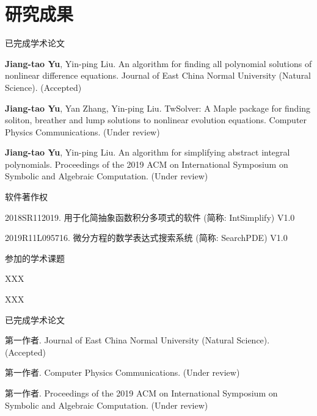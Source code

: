\chapter*{研究成果}

\ifdefined\RELESE %

\noindent 已完成学术论文
\begin{enumerate}[label={[\arabic*]},leftmargin=*]
\item {\bf Jiang-tao Yu}, Yin-ping Liu. An algorithm for finding all polynomial
solutions of nonlinear difference equations. Journal of East China Normal University (Natural Science). (Accepted)
\item {\bf Jiang-tao Yu}, Yan Zhang, Yin-ping Liu. TwSolver: A Maple package for finding soliton, breather and lump solutions to nonlinear evolution equations. Computer Physics Communications. (Under review)
\item {\bf Jiang-tao Yu}, Yin-ping Liu. An algorithm for simplifying abstract integral polynomials. Proceedings of the 2019 ACM on International Symposium on Symbolic and Algebraic Computation. (Under review)
\end{enumerate}

\noindent 软件著作权
\begin{enumerate}[label={[\arabic*]},leftmargin=*]
\item 2018SR112019. 用于化简抽象函数积分多项式的软件 (简称: IntSimplify) V1.0
\item 2019R11L095716. 微分方程的数学表达式搜索系统 (简称: SearchPDE) V1.0
\end{enumerate}

\noindent 参加的学术课题
\begin{enumerate}[label={[\arabic*]},leftmargin=*]
\item XXX
\item XXX
\end{enumerate}

\else %

\noindent 已完成学术论文
\begin{enumerate}[label={[\arabic*]},leftmargin=*]
\item 第一作者. Journal of East China Normal University (Natural Science). (Accepted)
\item 第一作者. Computer Physics Communications. (Under review)
\item 第一作者. Proceedings of the 2019 ACM on International Symposium on Symbolic and Algebraic Computation. (Under review)
\end{enumerate}

